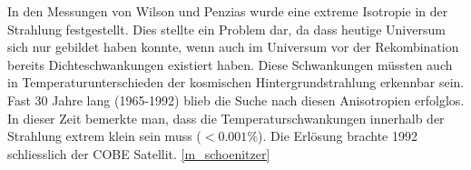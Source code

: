 In den Messungen von Wilson und Penzias wurde eine extreme Isotropie in der 
Strahlung festgestellt.
Dies stellte ein Problem dar, da dass heutige Universum sich nur gebildet haben 
konnte, wenn auch im Universum vor der Rekombination bereits Dichteschwankungen 
existiert haben.
Diese Schwankungen müssten auch in Temperaturunterschieden der kosmischen 
Hintergrundstrahlung erkennbar sein.
Fast 30 Jahre lang (1965-1992) blieb die Suche nach diesen Anisotropien 
erfolglos.
In dieser Zeit bemerkte man, dass die Temperaturschwankungen innerhalb der 
Strahlung extrem klein sein muss ($< 0.001\%$).
Die Erlösung brachte 1992 schliesslich der COBE Satellit.
\ref{m_schoenitzer}